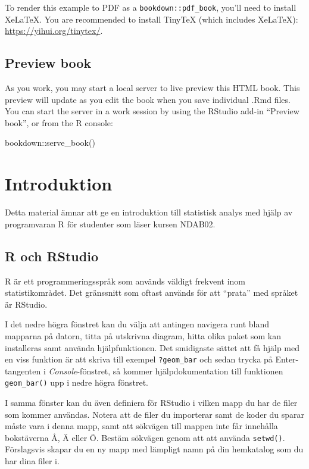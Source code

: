 \documentclass[
]{book}
\newenvironment{Shaded}{\begin{snugshade}}{\end{snugshade}}
\newcommand{\FunctionTok}[1]{\textcolor[rgb]{0.00,0.00,0.00}{#1}}
\newcommand{\NormalTok}[1]{#1}
\newcommand{\SpecialCharTok}[1]{\textcolor[rgb]{0.00,0.00,0.00}{#1}}
\theoremstyle{definition}
\theoremstyle{definition}
\theoremstyle{definition}
\theoremstyle{definition}
\theoremstyle{remark}
\begin{document}
To render this example to PDF as a \texttt{bookdown::pdf\_book}, you'll need to install XeLaTeX. You are recommended to install TinyTeX (which includes XeLaTeX): \url{https://yihui.org/tinytex/}.

\hypertarget{preview-book}{%
\section{Preview book}\label{preview-book}}

As you work, you may start a local server to live preview this HTML book. This preview will update as you edit the book when you save individual .Rmd files. You can start the server in a work session by using the RStudio add-in ``Preview book'', or from the R console:

\begin{Shaded}
\begin{Highlighting}[]
\NormalTok{bookdown}\SpecialCharTok{::}\FunctionTok{serve\_book}\NormalTok{()}
\end{Highlighting}
\end{Shaded}

\hypertarget{introduktion}{%
\chapter{Introduktion}\label{introduktion}}

Detta material ämnar att ge en introduktion till statistisk analys med hjälp av programvaran R för studenter som läser kursen NDAB02.

\hypertarget{r-och-rstudio}{%
\section{R och RStudio}\label{r-och-rstudio}}

R är ett programmeringsspråk som används väldigt frekvent inom statistikområdet. Det gränssnitt som oftast används för att ``prata'' med språket är RStudio.

I det nedre högra fönstret kan du välja att antingen navigera runt bland mapparna på datorn, titta på utskrivna diagram, hitta olika paket som kan installeras samt använda hjälpfunktionen. Det smidigaste sättet att få hjälp med en viss funktion är att skriva till exempel \texttt{?geom\_bar} och sedan trycka på Enter-tangenten i \emph{Console}-fönstret, så kommer hjälpdokumentation till funktionen \texttt{geom\_bar()} upp i nedre högra fönstret.

I samma fönster kan du även definiera för RStudio i vilken mapp du har de filer som kommer användas. Notera att de filer du importerar samt de koder du sparar måste vara i denna mapp, samt att sökvägen till mappen inte får innehålla bokstäverna Å, Ä eller Ö. Bestäm sökvägen genom att att använda \texttt{setwd()}. Förslagsvis skapar du en ny mapp med lämpligt namn på din hemkatalog som du har dina filer i.
\end{document}
